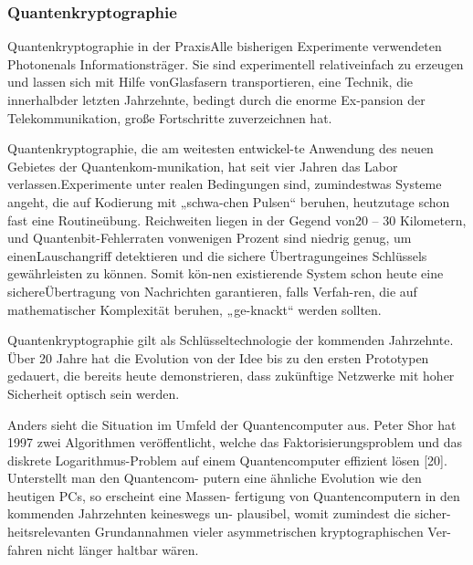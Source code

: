 \subsubsection{Quantenkryptographie}

\cite{tittel_brendel_gisin_ribordy_zbinden_1999}
Quantenkryptographie in der PraxisAlle bisherigen Experimente verwendeten Photonenals Informationsträger. Sie sind experimentell relativeinfach zu erzeugen und lassen sich mit Hilfe vonGlasfasern transportieren, eine Technik, die innerhalbder letzten Jahrzehnte, bedingt durch die enorme Ex-pansion der Telekommunikation, große Fortschritte zuverzeichnen hat. 

Quantenkryptographie, die am weitesten entwickel-te Anwendung des neuen Gebietes der Quantenkom-munikation, hat seit vier Jahren das Labor verlassen.Experimente unter realen Bedingungen sind, zumindestwas Systeme angeht, die auf Kodierung mit „schwa-chen Pulsen“ beruhen, heutzutage schon fast eine Routineübung. Reichweiten liegen in der Gegend von20 – 30 Kilometern, und Quantenbit-Fehlerraten vonwenigen Prozent sind niedrig genug, um einenLauschangriff detektieren und die sichere Übertragungeines Schlüssels gewährleisten zu können. Somit kön-nen existierende System schon heute eine sichereÜbertragung von Nachrichten garantieren, falls Verfah-ren, die auf mathematischer Komplexität beruhen, „ge-knackt“ werden sollten. 

\cite{rass_schartner_2002}
Quantenkryptographie gilt als Schlüsseltechnologie der kommenden Jahrzehnte. Über 20 Jahre hat die Evolution von der Idee bis zu den ersten Prototypen gedauert, die bereits heute demonstrieren, dass zukünftige Netzwerke mit hoher Sicherheit optisch sein werden.

Anders sieht die Situation im Umfeld der Quantencomputer aus. Peter Shor hat 1997 zwei Algorithmen veröffentlicht, welche das Faktorisierungsproblem und das diskrete Logarithmus-Problem auf einem Quantencomputer effizient lösen [20]. Unterstellt man den Quantencom- putern eine ähnliche Evolution wie den heutigen PCs, so erscheint eine Massen- fertigung von Quantencomputern in den kommenden Jahrzehnten keineswegs un- plausibel, womit zumindest die sicher- heitsrelevanten Grundannahmen vieler asymmetrischen kryptographischen Ver- fahren nicht länger haltbar wären.

